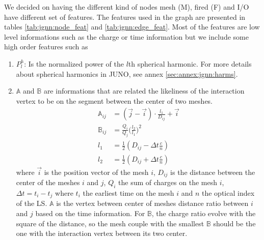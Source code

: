 \documentclass[../main.tex]{subfiles}
\begin{document}
We decided on having the different kind of nodes {\color{Dandelion} mesh (M)}, {\color{red} fired (F)} and {\color{blue} I/O} have different set of features. The features used in the graph are presented in tables \ref{tab:jgnn:node_feat} and \ref{tab:jgnn:edge_feat}. Most of the features are low level informations such as the charge or time information but we include some high order features such as
\begin{enumerate}
  \item $P^h_l$: Is the normalized power of the $l$th spherical harmonic. For more details about spherical harmonics in JUNO, see annex \ref{sec:annex:jgnn:harms}.
  \item $\mathbb{A}$ and $\mathbb{B}$ are informations that are related the likeliness of the interaction vertex to be on the segment between the center of two meshes.
    \begin{align}
      \mathbb{A}_{ij} &= (\vec{j} - \vec{i})\cdot\frac{l_1}{D_{ij}} + \vec{i} \\
      \mathbb{B}_{ij} &= \frac{Q_i}{Q_j} \bigg(\frac{l_2}{l_1}\bigg)^2 \\
      l_1 &= \frac{1}{2}(D_{ij} - \Delta t \frac{c}{n}) \\
      l_2 &= \frac{1}{2}(D_{ij} + \Delta t \frac{c}{n})
    \end{align}
    where $\vec{i}$ is the position vector of the mesh $i$, $D_{ij}$ is the distance between the center of the meshes $i$ and $j$, $Q_i$ the sum of charges on the mesh $i$, $\Delta t = t_i - t_j$ where $t_i$ the earliest time on the mesh $i$ and $n$ the optical index of the LS. $\mathbb{A}$ is the vertex between center of meshes distance ratio between $i$ and $j$ based on the time information. For $\mathbb{B}$, the charge ratio evolve with the square of the distance, so the mesh couple with the smallest $\mathbb{B}$ should be the one with the interaction vertex between its two center.
\end{enumerate}
\end{document}
